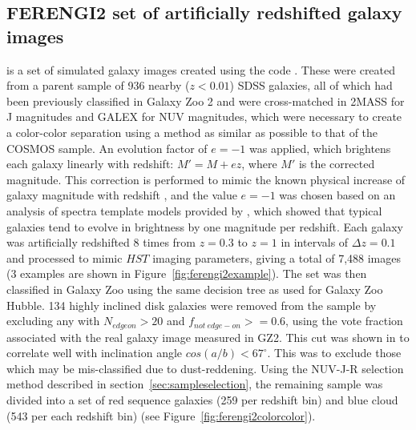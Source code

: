 \documentclass[useAMS,usenatbib]{mn2e}
\begin{document}
\subsection{FERENGI2 set of artificially redshifted galaxy images}
\label{ssec:ferengi}
 is a set of simulated galaxy images created using the \ferengi{} code \citep{Barden2008}. These were created from a parent sample of 936 nearby ($z<0.01$) SDSS galaxies, all of which had been previously classified in Galaxy Zoo 2 and were cross-matched in 2MASS \citep{Skrutskie2006} for J magnitudes and GALEX \citep{Martin2005} for NUV magnitudes, which were necessary to create a color-color separation using a method as similar as possible to that of the COSMOS sample.  An evolution factor of $e=-1$ was applied, which brightens each galaxy linearly with redshift: $M' = M + ez$, where $M'$ is the corrected magnitude. This correction is performed to mimic the known physical increase of galaxy magnitude with redshift \citep{Lilly1998,Loveday2011}, and the value $e=-1$ was chosen based on an analysis of spectra template models provided by \citet{Brinchmann2004a}, which showed that typical galaxies tend to evolve in brightness by one magnitude per redshift. Each galaxy was artificially redshifted 8 times from $z=0.3$ to $z=1$ in intervals of $\Delta z = 0.1$ and processed to mimic $HST$ imaging parameters, giving a total of 7,488 images (3 examples are shown in Figure~\ref{fig:ferengi2example}).  The set was then classified in Galaxy Zoo using the same decision tree as used for Galaxy Zoo Hubble. 134 highly inclined disk galaxies were removed from the sample by excluding any with $N_{edgeon}>20$ and $f_{not~edge-on}>=0.6$, using the vote fraction associated with the real galaxy image measured in GZ2. This cut was shown in \citet{Galloway2015} to correlate well with inclination angle $cos(a/b)<67^\circ$. This was to exclude those which may be mis-classified due to dust-reddening.  Using the NUV-J-R selection method described in section~\ref{sec:sampleselection}, the remaining sample was divided into a set of red sequence galaxies (259 per redshift bin) and blue cloud (543 per each redshift bin) (see Figure~\ref{fig:ferengi2colorcolor}).
\end{document}
